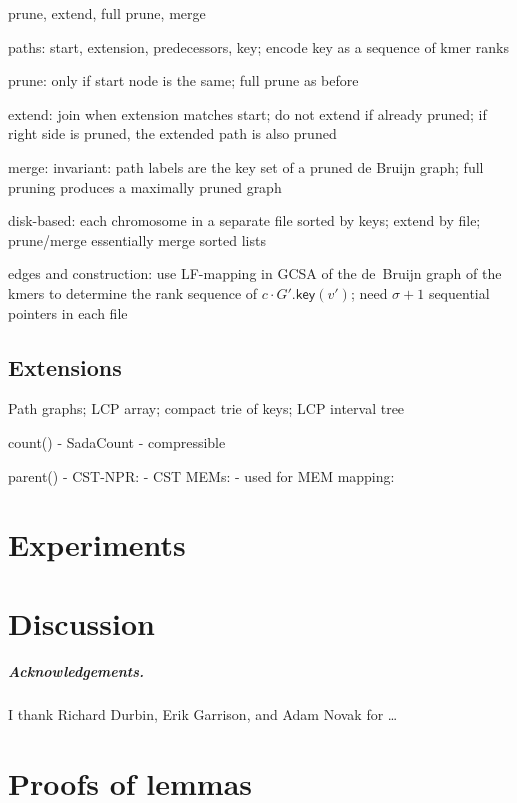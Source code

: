 \documentclass[a4paper,UKenglish]{lipics-v2016}
\newcommand{\gkey}{\ensuremath{\mathsf{key}}}
\newcommand{\LFmapping}{LF\nobreakdash-mapping}
\begin{document}
prune, extend, full prune, merge

paths: start, extension, predecessors, key; encode key as a sequence of kmer ranks

prune: only if start node is the same; full prune as before

extend: join when extension matches start; do not extend if already pruned; if right side is pruned, the extended path is also pruned

merge: invariant: path labels are the key set of a pruned de Bruijn graph; full pruning produces a maximally pruned graph

disk-based: each chromosome in a separate file sorted by keys; extend by file; prune/merge essentially merge sorted lists

edges and construction: use \LFmapping{} in GCSA of the de~Bruijn graph of the kmers to determine the rank sequence of $c \cdot G'.\gkey(v')$; need $\sigma + 1$ sequential pointers in each file

\subsection{Extensions}

Path graphs; LCP array; compact trie of keys; LCP interval tree

count()
- SadaCount \cite{Sadakane2007a}
- compressible \cite{Gagie2015}

parent()
- CST-NPR: \cite{Fischer2009a}
- CST MEMs: \cite{Ohlebusch2010a}
- used for MEM mapping: \cite{Li2013}

\section{Experiments}


\section{Discussion}


\subparagraph*{Acknowledgements.}

I thank Richard Durbin, Erik Garrison, and Adam Novak for \dots





\clearpage
\appendix
\section{Proofs of lemmas}
\end{document}
